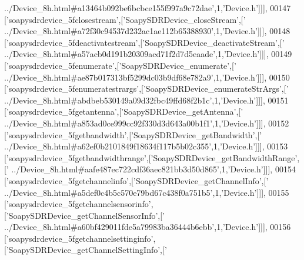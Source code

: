 \begin{DoxyCode}
{      ../Device\_8h.html#a13464b092be6bcbce155f997a9c72dae'},1,\textcolor{stringliteral}{'Device.h'}]]],
00147   [\textcolor{stringliteral}{'soapysdrdevice\_5fclosestream'},[\textcolor{stringliteral}{'SoapySDRDevice\_closeStream'},[\textcolor{stringliteral}{'
      ../Device\_8h.html#a72f30c94537d232ac1ae112b65388930'},1,\textcolor{stringliteral}{'Device.h'}]]],
00148   [\textcolor{stringliteral}{'soapysdrdevice\_5fdeactivatestream'},[\textcolor{stringliteral}{'SoapySDRDevice\_deactivateStream'},[\textcolor{stringliteral}{'
      ../Device\_8h.html#a57acb0d191b20309acd71f2d7d5eaade'},1,\textcolor{stringliteral}{'Device.h'}]]],
00149   [\textcolor{stringliteral}{'soapysdrdevice\_5fenumerate'},[\textcolor{stringliteral}{'SoapySDRDevice\_enumerate'},[\textcolor{stringliteral}{'
      ../Device\_8h.html#ae87b017313bf5299dc03b9df68e782a9'},1,\textcolor{stringliteral}{'Device.h'}]]],
00150   [\textcolor{stringliteral}{'soapysdrdevice\_5fenumeratestrargs'},[\textcolor{stringliteral}{'SoapySDRDevice\_enumerateStrArgs'},[\textcolor{stringliteral}{'
      ../Device\_8h.html#abdbeb530149a09d32fbc49ffd68f2b1c'},1,\textcolor{stringliteral}{'Device.h'}]]],
00151   [\textcolor{stringliteral}{'soapysdrdevice\_5fgetantenna'},[\textcolor{stringliteral}{'SoapySDRDevice\_getAntenna'},[\textcolor{stringliteral}{'
      ../Device\_8h.html#a853ad0ce999cc92f330d3d643a00b1f1'},1,\textcolor{stringliteral}{'Device.h'}]]],
00152   [\textcolor{stringliteral}{'soapysdrdevice\_5fgetbandwidth'},[\textcolor{stringliteral}{'SoapySDRDevice\_getBandwidth'},[\textcolor{stringliteral}{'
      ../Device\_8h.html#a62ef0b2101849f18634f117b5b02c355'},1,\textcolor{stringliteral}{'Device.h'}]]],
00153   [\textcolor{stringliteral}{'soapysdrdevice\_5fgetbandwidthrange'},[\textcolor{stringliteral}{'SoapySDRDevice\_getBandwidthRange'},[\textcolor{stringliteral}{'
      ../Device\_8h.html#aafe487ec722cdf36aec821bb3d50d865'},1,\textcolor{stringliteral}{'Device.h'}]]],
00154   [\textcolor{stringliteral}{'soapysdrdevice\_5fgetchannelinfo'},[\textcolor{stringliteral}{'SoapySDRDevice\_getChannelInfo'},[\textcolor{stringliteral}{'
      ../Device\_8h.html#a5def0c4b5c570e79bd67c438f0a751b5'},1,\textcolor{stringliteral}{'Device.h'}]]],
00155   [\textcolor{stringliteral}{'soapysdrdevice\_5fgetchannelsensorinfo'},[\textcolor{stringliteral}{'SoapySDRDevice\_getChannelSensorInfo'},[\textcolor{stringliteral}{'
      ../Device\_8h.html#a60bf429011fde5a79983ba36444b6ebb'},1,\textcolor{stringliteral}{'Device.h'}]]],
00156   [\textcolor{stringliteral}{'soapysdrdevice\_5fgetchannelsettinginfo'},[\textcolor{stringliteral}{'SoapySDRDevice\_getChannelSettingInfo'},[\textcolor{stringliteral}{'
}
\end{DoxyCode}
